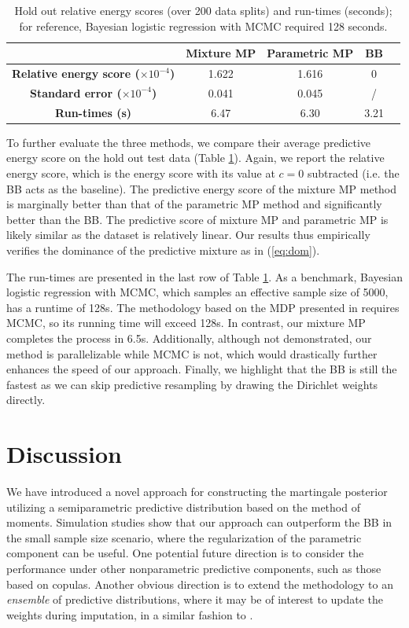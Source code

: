 \documentclass[11pt,a4paper]{article}
\theoremstyle{plain}
\theoremstyle{remark}
\theoremstyle{remark}
\begin{document}
\begin{table}[h]
\vspace{4mm}
\centering
    \scriptsize
    \begin{tabular}{c c c c c}
        \hline
          & \textbf{Mixture MP} & \textbf{Parametric MP} & \textbf{BB}\\ \hline
        \textbf{Relative energy score ($\times 10^{-4}$)} &1.622 & 1.616 & 0\\ 
        \textbf{Standard error ($\times 10^{-4}$)} & 0.041 & 0.045 & / \\ \hline
        \textbf{Run-times (s)} &6.47 & 6.30 & 3.21\\
        \hline
    \end{tabular}
    \caption{Hold out relative energy scores  (over 200 data splits) and run-times (seconds); for reference, Bayesian logistic regression with MCMC required 128 seconds. 
}
    \label{table3}
    \end{table}

To further evaluate the three methods, we compare their average predictive energy score on the hold out test data (Table \ref{table3}). Again, we report the relative energy score, which is the energy score with its value at $c = 0$ subtracted (i.e. the BB acts as the baseline). The predictive energy score of the mixture MP method is marginally better than that of the parametric MP method and significantly better than the BB. The predictive score of mixture MP and parametric MP is likely similar as the dataset is relatively linear. Our results thus empirically verifies the dominance of the predictive mixture as in (\ref{eq:dom}).


The run-times are presented in the last row of Table \ref{table3}. As a benchmark, Bayesian logistic regression with MCMC, which samples an effective sample size of 5000, has a runtime of 128s.  The methodology based on the MDP presented in \cite{Lyddon2018} requires MCMC, so its running time will exceed 128s. In contrast, our mixture MP completes the process in 6.5s. Additionally, although not demonstrated, our method is parallelizable while MCMC is not, which would drastically further enhances the speed of our approach. Finally, we highlight that the BB is still the fastest as we can skip predictive resampling by drawing the Dirichlet weights directly.


\section{Discussion}
We have introduced a novel approach for constructing the martingale posterior utilizing a semiparametric predictive distribution based on the method of moments. Simulation studies show that our approach can outperform the BB in the small sample size scenario, where the regularization of the parametric component can be useful. One potential future direction is to consider the performance under other nonparametric predictive components, such as those based on copulas. Another obvious direction is to extend the methodology to an \textit{ensemble} of predictive distributions, where it may be of interest to update the weights during imputation, in a similar fashion to \cite{shirvaikar2024general}.
\end{document}
